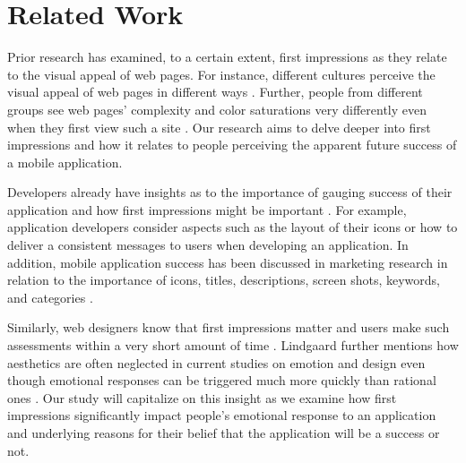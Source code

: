 \section{Related Work}


Prior research has examined, to a certain extent, first impressions as they relate to the visual appeal of web pages. For instance, different cultures perceive the visual appeal of web pages in different ways \cite{Reinecke:2013:PUF:2470654.2481281}. Further, people from different groups see web pages' complexity and color saturations very differently even when they first view such a site \cite{Reinecke:2013:PUF:2470654.2481281}. Our research aims to delve deeper into first impressions and how it relates to people perceiving the apparent future success of a mobile application.

Developers already have insights as to the importance of gauging success of their application and how first impressions might be important \cite{wooldridge2010the}. For example, application developers consider aspects such as the layout of their icons or how to deliver a consistent messages to users when developing an application. In addition, mobile application success has been discussed in marketing research in relation to the importance of icons, titles, descriptions, screen shots, keywords, and categories \cite{mureta12:app}.

Similarly, web designers know that first impressions matter and users make such assessments within a very short amount of time \cite{lindgaard}. Lindgaard further mentions how aesthetics are often neglected in current studies on emotion and design even though emotional responses can be triggered much more quickly than rational ones \cite{lindgaard}. Our study will capitalize on this insight as we examine how first impressions significantly impact people's emotional response to an application and underlying reasons for their belief that the application will be a success or not.